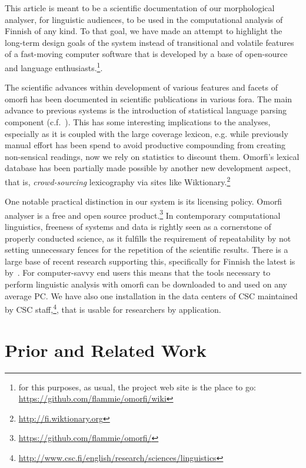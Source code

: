 \documentclass[a4paper,12pt]{article}
\begin{document}
This article is meant to be a scientific documentation of our morphological
analyser, for linguistic audiences, to be used in the computational analysis of
Finnish of any kind. To that goal, we have made an attempt to highlight the
long-term design goals of the system instead of transitional and volatile
features of a fast-moving computer software that is developed by a base of
open-source and language enthusiasts.\footnote{for this purposes, as usual, the
project web site is the place to go:
\url{https://github.com/flammie/omorfi/wiki}}.

The scientific advances within development of various features and facets of
omorfi has been documented in scientific publications in various fora. The main
advance to previous systems is the introduction of statistical language parsing
component (c.f.~\citet[for basic introduction]{manning}). This has some
interesting implications to the analyses, especially as it is coupled with the
large coverage lexicon, e.g. while previously manual effort has been spend to
avoid productive compounding from creating non-sensical readings, now we rely
on statistics to discount them. Omorfi's lexical database has been partially
made possible by another new development aspect, that is,
\textit{crowd-sourcing} lexicography via sites like
Wiktionary.\footnote{\url{http://fi.wiktionary.org}}

One notable practical distinction in our system is its licensing policy. Omorfi
analyser is a free and open source product.\footnote{
\url{https://github.com/flammie/omorfi/}}  In contemporary computational
linguistics, freeness of systems and data is rightly seen as a cornerstone of
properly conducted science, as it fulfills the requirement of repeatability by
not setting unnecessary fences for the repetition of the scientific results.
There is a large base of recent research supporting this, specifically for
Finnish the latest is by~\citet{koskenniemi2008build}. For computer-savvy end
users this means that the tools necessary to perform linguistic analysis with
omorfi can be downloaded to and used on any average PC. We have also one
installation in the data centers of CSC maintained by CSC
staff,\footnote{\url{http://www.csc.fi/english/research/sciences/linguistics}},
that is usable for researchers by application.

\section{Prior and Related Work}
\label{sec:prior-work}
\end{document}
